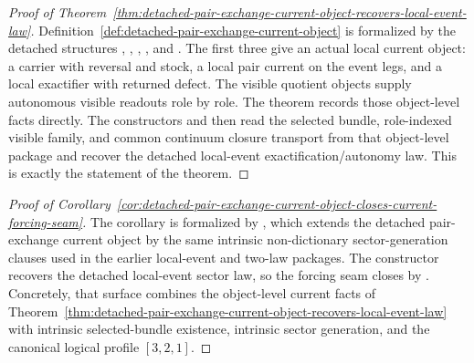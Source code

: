\begin{proof}[Proof of Theorem~\ref{thm:detached-pair-exchange-current-object-recovers-local-event-law}]
\label{proof:thm:detached-pair-exchange-current-object-recovers-local-event-law}
Definition~\ref{def:detached-pair-exchange-current-object} is formalized by the
detached structures ,
,
,
, and
. The first three give an actual local
current object: a carrier with reversal and stock, a local pair current on the
event legs, and a local exactifier with returned defect. The visible quotient
objects supply autonomous visible readouts role by role. The theorem
 records those object-level
facts directly. The constructors
 and
 then read
the selected bundle, role-indexed visible family, and common continuum closure
transport from that object-level package and recover the detached local-event
exactification/autonomy law. This is exactly the statement of the theorem.
\end{proof}

\begin{proof}[Proof of Corollary~\ref{cor:detached-pair-exchange-current-object-closes-current-forcing-seam}]
\label{proof:cor:detached-pair-exchange-current-object-closes-current-forcing-seam}
The corollary is formalized by ,
which extends the detached pair-exchange current object by the same intrinsic
non-dictionary sector-generation clauses used in the earlier local-event and
two-law packages. The constructor
 recovers the
detached local-event sector law, so the forcing seam closes by
. Concretely, that surface
combines the object-level current facts of
Theorem~\ref{thm:detached-pair-exchange-current-object-recovers-local-event-law}
with intrinsic selected-bundle existence, intrinsic sector generation, and the
canonical logical profile \([3,2,1]\).
\end{proof}

